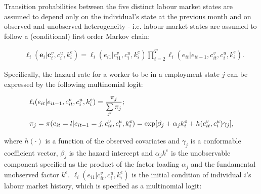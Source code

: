 \documentclass[12pt, a4paper]{article}
\begin{document}
Transition probabilities between the five distinct labour market states are assumed to depend only on the individual's state at the previous month and on observed and unobserved heterogeneity - i.e. labour market states are assumed to follow a (conditional) first order Markov chain:

\begin{align}
& \ell_{i}(\textbf{e}_i|\textbf{c}_{i}^{v},c_{i}^{u},k^e_{i})=\ell_{i}(e_{i1}|c_{i1}^{v},c_{i}^{u},k^e_{i})\prod_{t=2}^{T} \ell_{i}(e_{it}|e_{it-1},c_{it}^{v},c_{i}^{u},k^e_{i}).
\end{align}


Specifically, the hazard rate for a worker to be in a employment state $j$ can be expressed by the following multinomial logit:

\begin{align}
& \ell_{i}(e_{it}|e_{it-1},c_{it}^v,c_i^u,k_i^{e})  = \frac{\pi_{j}}{\sum\limits_{j'}\pi_{j}}; \nonumber \\
& \pi_{j} = \pi (e_{it}=l|e_{it-1}=j,c_{it}^v,c_i^u,k_i^{e})=\text{exp}\large[\beta_{j}+\alpha_{j}k_{i}^{e}+h(c_{it}^{v},c_{i}^{u})\gamma_{j}\large],
\end{align} 

%
%


where $h(\cdot)$ is a function of the observed covariates and $\gamma_{j}$ is a conformable coefficient vector, $\beta_{j}$ is the hazard intercept and $\alpha_{j}k^{e}$ is the unobservable component specified as the product of the factor loading $\alpha_{j}$ and the fundamental unobserved factor $k^{e}$. $\ell_{i}(e_{i1}|c_{it}^v,c_i^u,k_i^e)$ is the initial condition of individual $i$'s labour market history, which is specified as a multinomial logit:

%
\end{document}
